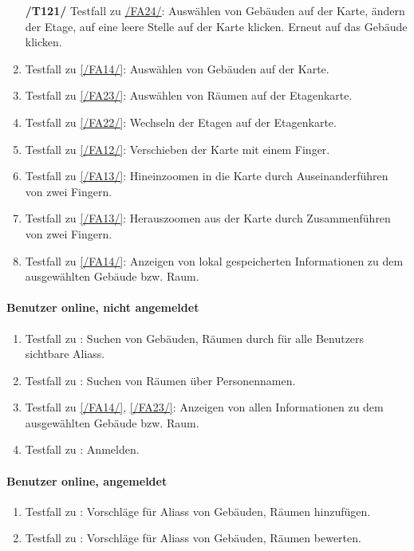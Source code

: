 \begin{enumerate}[label=\textbf{/T\arabic*0/}, align=left]
	\item[\textbf{/T121/}] \label{/T121/} Testfall zu \hyperref[/FA24/]{/FA24/}: Auswählen von Gebäuden auf der \Gls{Karte}, ändern der Etage, auf eine leere Stelle auf der \Gls{Karte} klicken. Erneut auf das Gebäude klicken.
	\item \label{/T130/} Testfall zu \ref{/FA14/}: Auswählen von Gebäuden auf der \Gls{Karte}.
	\item \label{/T140/} Testfall zu \ref{/FA23/}: Auswählen von Räumen auf der \Gls{Etagenkarte}.
	\item \label{/T150/} Testfall zu \ref{/FA22/}: Wechseln der Etagen auf der \Gls{Etagenkarte}.
	\item \label{/T160/} Testfall zu \ref{/FA12/}: Verschieben der \Gls{Karte} mit einem Finger.
	\item \label{/T170/} Testfall zu \ref{/FA13/}: Hineinzoomen in die \Gls{Karte} durch Auseinanderführen von zwei Fingern.
	\item \label{/T180/} Testfall zu \ref{/FA13/}: Herauszoomen aus der \Gls{Karte} durch Zusammenführen von zwei Fingern.
	\item \label{/T190/} Testfall zu \ref{/FA14/}: Anzeigen von \gls{lokal} gespeicherten Informationen zu dem ausgewählten Gebäude bzw. Raum.
\end{enumerate}

\paragraph{\Gls{Benutzer} online, nicht angemeldet}
\begin{enumerate}[label=\textbf{/T\arabic*0/}, align=left, resume]
	\item \label{/T200/} Testfall zu : Suchen von Gebäuden, Räumen durch für alle \Glspl{Benutzer} sichtbare \Glspl{Alias}.
	\item \label{/T210/} Testfall zu : Suchen von Räumen über Personennamen.
	\item \label{/T220/} Testfall zu \ref{/FA14/}, \ref{/FA23/}: Anzeigen von allen Informationen zu dem ausgewählten Gebäude bzw. Raum.
	\item \label{/T230/} Testfall zu : Anmelden.
\end{enumerate}

\paragraph{\Gls{Benutzer} online, angemeldet}
\begin{enumerate}[label=\textbf{/T\arabic*0/}, align=left, resume]
	\item \label{/T240/} Testfall zu : Vorschläge für \Glspl{Alias} von Gebäuden, Räumen hinzufügen.
	\item \label{/T250/} Testfall zu : Vorschläge für \Glspl{Alias} von Gebäuden, Räumen bewerten.
\end{enumerate}

